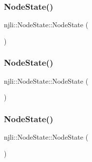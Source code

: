 \subsubsection{\texorpdfstring{Node\+State()}{NodeState()}\hspace{0.1cm}{\footnotesize\ttfamily [1/3]}}
{\footnotesize\ttfamily njli\+::\+Node\+State\+::\+Node\+State (\begin{DoxyParamCaption}{ }\end{DoxyParamCaption})\hspace{0.3cm}{\ttfamily [protected]}}

\mbox{\label{classnjli_1_1_node_state_a1cd1d39f5b5e14e5466d4bcb75adc568}} 
\subsubsection{\texorpdfstring{Node\+State()}{NodeState()}\hspace{0.1cm}{\footnotesize\ttfamily [2/3]}}
{\footnotesize\ttfamily njli\+::\+Node\+State\+::\+Node\+State (\begin{DoxyParamCaption}\item[{const \mbox{\hyperlink{classnjli_1_1_abstract_builder}{Abstract\+Builder}} \&}]{ }\end{DoxyParamCaption})\hspace{0.3cm}{\ttfamily [protected]}}

\mbox{\label{classnjli_1_1_node_state_a102adf95d05a404dc6b564ea7a18c723}} 
\subsubsection{\texorpdfstring{Node\+State()}{NodeState()}\hspace{0.1cm}{\footnotesize\ttfamily [3/3]}}
{\footnotesize\ttfamily njli\+::\+Node\+State\+::\+Node\+State (\begin{DoxyParamCaption}\item[{const \mbox{\hyperlink{classnjli_1_1_node_state}{Node\+State}} \&}]{ }\end{DoxyParamCaption})\hspace{0.3cm}{\ttfamily [protected]}}

